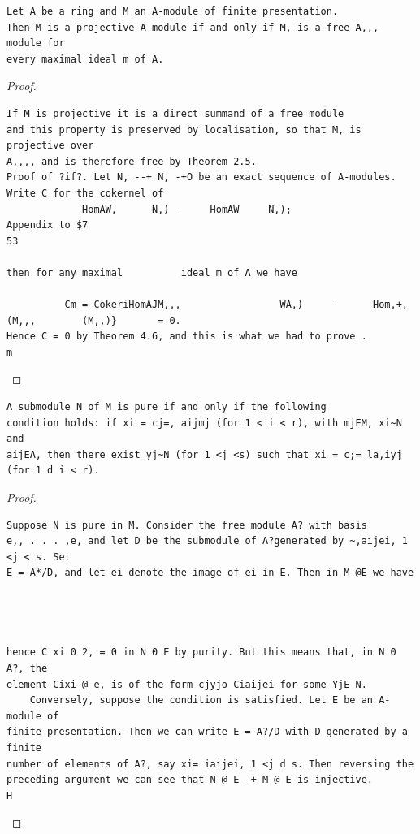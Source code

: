 \begin{theorem}\label{mcrt-auto-theorem-7-12}\uses{}
\begin{verbatim}
Let A be a ring and M an A-module of finite presentation.
Then M is a projective A-module if and only if M, is a free A,,,-module for
every maximal ideal m of A.
\end{verbatim}
\end{theorem}
\begin{proof}
\begin{verbatim}
If M is projective it is a direct summand of a free module
and this property is preserved by localisation, so that M, is projective over
A,,,, and is therefore free by Theorem 2.5.
Proof of ?if?. Let N, --+ N, -+O be an exact sequence of A-modules.
Write C for the cokernel of
             HomAW,      N,) -     HomAW     N,);
Appendix to $7                                                                               53

then for any maximal          ideal m of A we have

          Cm = CokeriHomAJM,,,                 WA,)     -      Hom,+,(M,,,        (M,,)}       = 0.
Hence C = 0 by Theorem 4.6, and this is what we had to prove .                                    m
\end{verbatim}
\end{proof}


\begin{theorem}\label{mcrt-auto-theorem-7-13}\uses{}
\begin{verbatim}
A submodule N of M is pure if and only if the following
condition holds: if xi = cj=, aijmj (for 1 < i < r), with mjEM, xi~N and
aijEA, then there exist yj~N (for 1 <j <s) such that xi = c;= la,iyj
(for 1 d i < r).
\end{verbatim}
\end{theorem}
\begin{proof}
\begin{verbatim}
Suppose N is pure in M. Consider the free module A? with basis
e,, . . . ,e, and let D be the submodule of A?generated by ~,aijei, 1 <j < s. Set
E = A*/D, and let ei denote the image of ei in E. Then in M @E we have




hence C xi 0 2, = 0 in N 0 E by purity. But this means that, in N 0 A?, the
element Cixi @ e, is of the form cjyjo Ciaijei for some YjE N.
    Conversely, suppose the condition is satisfied. Let E be an A-module of
finite presentation. Then we can write E = A?/D with D generated by a finite
number of elements of A?, say xi= iaijei, 1 <j d s. Then reversing the
preceding argument we can see that N @ E -+ M @ E is injective.         H
\end{verbatim}
\end{proof}


